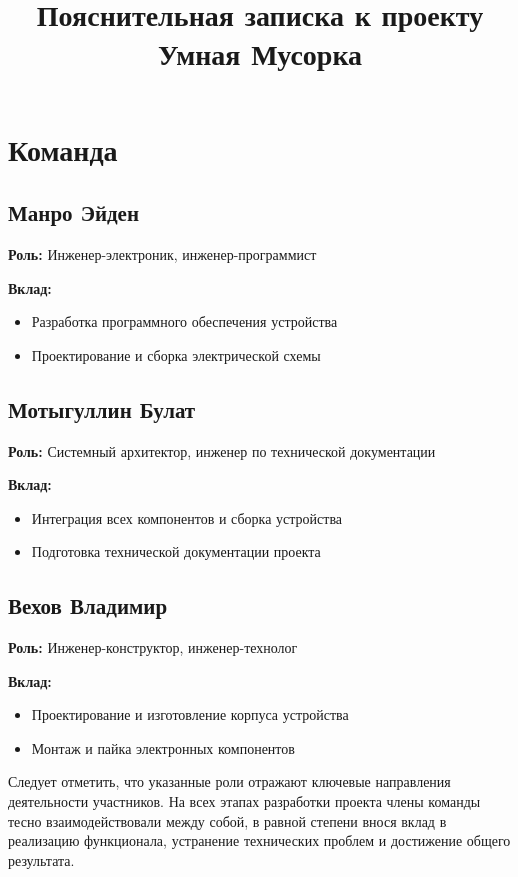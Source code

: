 \documentclass[a4paper, 12pt]{article} %
\title{\textbf{Пояснительная записка к проекту Умная Мусорка}}
\date{}
\begin{document}
\maketitle

\section{Команда}

\subsection*{Манро Эйден}

\noindent\textbf{Роль:} Инженер-электроник, инженер-программист

\noindent\textbf{Вклад:}  
\begin{itemize}
    \item Разработка программного обеспечения устройства
    \item Проектирование и сборка электрической схемы
\end{itemize}

\subsection*{Мотыгуллин Булат}

\noindent\textbf{Роль:} Системный архитектор, инженер по технической документации

\noindent\textbf{Вклад:}  
\begin{itemize}
    \item Интеграция всех компонентов и сборка устройства
    \item Подготовка технической документации проекта
\end{itemize}

\subsection*{Вехов Владимир}

\noindent\textbf{Роль:} Инженер-конструктор, инженер-технолог

\noindent\textbf{Вклад:}  
\begin{itemize}
    \item Проектирование и изготовление корпуса устройства
    \item Монтаж и пайка электронных компонентов
\end{itemize}

\noindent Следует отметить, что указанные роли отражают ключевые направления деятельности участников. На всех этапах разработки проекта члены команды тесно взаимодействовали между собой, в равной степени внося вклад в реализацию функционала, устранение технических проблем и достижение общего результата.
\end{document}
